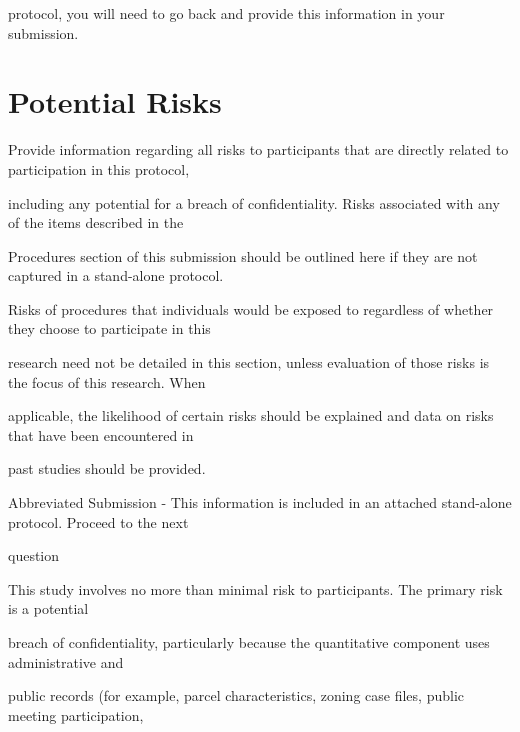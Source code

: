 \documentclass[10pt, letterpaper]{article}
\begin{document}
protocol, you will need to go back and provide this information in your submission.

\vspace{0.5em}

\vspace{0.5em}

\section*{Potential Risks}

Provide information regarding all risks to participants that are directly related to participation in this protocol,

including any potential for a breach of confidentiality. Risks associated with any of the items described in the

Procedures section of this submission should be outlined here if they are not captured in a stand-alone protocol.

Risks of procedures that individuals would be exposed to regardless of whether they choose to participate in this

research need not be detailed in this section, unless evaluation of those risks is the focus of this research. When

applicable, the likelihood of certain risks should be explained and data on risks that have been encountered in

past studies should be provided.

\noindent \makebox[0pt][l]{$\square$}\hspace{1.2em} Abbreviated Submission - This information is included in an attached stand-alone protocol. Proceed to the next

question

\vspace{0.5em}

\vspace{0.5em}

\begin{responsebox}

This study involves no more than minimal risk to participants. The primary risk is a potential

\end{responsebox}

breach of confidentiality, particularly because the quantitative component uses administrative and

public records (for example, parcel characteristics, zoning case files, public meeting participation,
\end{document}
